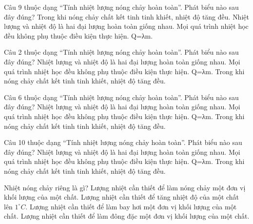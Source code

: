 \begin{ex}
Câu 9 thuộc dạng “Tính nhiệt lượng nóng chảy hoàn toàn”. Phát biểu nào sau đây đúng?
\choice
{Trong khi nóng chảy chất kết tinh tinh khiết, nhiệt độ tăng đều.}
{Nhiệt lượng và nhiệt độ là hai đại lượng hoàn toàn giống nhau.}
{Mọi quá trình nhiệt học đều không phụ thuộc điều kiện thực hiện.}
{\True Q=λm.}
\end{ex}

\begin{ex}
Câu 2 thuộc dạng “Tính nhiệt lượng nóng chảy hoàn toàn”. Phát biểu nào sau đây đúng?
\choice
{Nhiệt lượng và nhiệt độ là hai đại lượng hoàn toàn giống nhau.}
{Mọi quá trình nhiệt học đều không phụ thuộc điều kiện thực hiện.}
{\True Q=λm.}
{Trong khi nóng chảy chất kết tinh tinh khiết, nhiệt độ tăng đều.}
\end{ex}

\begin{ex}
Câu 6 thuộc dạng “Tính nhiệt lượng nóng chảy hoàn toàn”. Phát biểu nào sau đây đúng?
\choice
{Nhiệt lượng và nhiệt độ là hai đại lượng hoàn toàn giống nhau.}
{Mọi quá trình nhiệt học đều không phụ thuộc điều kiện thực hiện.}
{\True Q=λm.}
{Trong khi nóng chảy chất kết tinh tinh khiết, nhiệt độ tăng đều.}
\end{ex}

\begin{ex}
Câu 10 thuộc dạng “Tính nhiệt lượng nóng chảy hoàn toàn”. Phát biểu nào sau đây đúng?
\choice
{Nhiệt lượng và nhiệt độ là hai đại lượng hoàn toàn giống nhau.}
{Mọi quá trình nhiệt học đều không phụ thuộc điều kiện thực hiện.}
{\True Q=λm.}
{Trong khi nóng chảy chất kết tinh tinh khiết, nhiệt độ tăng đều.}
\end{ex}
\begin{ex}
Nhiệt nóng chảy riêng là gì?
\choice
{\True Lượng nhiệt cần thiết để làm nóng chảy một đơn vị khối lượng của một chất.}
{Lượng nhiệt cần thiết để tăng nhiệt độ của một chất lên $1^\circ C$.}
{Lượng nhiệt cần thiết để làm bay hơi một đơn vị khối lượng của một chất.}
{Lượng nhiệt cần thiết để làm đông đặc một đơn vị khối lượng của một chất.}
\end{ex}

